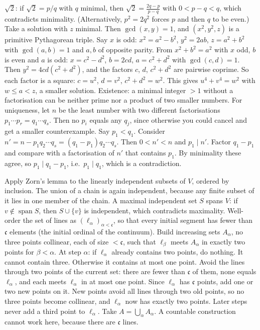 \documentclass[11pt,a4paper]{article}
\begin{document}
 $\sqrt2$: if $\sqrt2=p/q$ with $q$ minimal, then $\sqrt2=\frac{2q-p}{p-q}$ with $0<p-q<q$, which contradicts minimality. (Alternatively, $p^2=2q^2$ forces $p$ and then $q$ to be even.)
 Take a solution with $z$ minimal. Then $\gcd(x,y)=1$, and $(x^2,y^2,z)$ is a primitive Pythagorean triple. Say $x$ is odd: $x^2=a^2-b^2$, $y^2=2ab$, $z=a^2+b^2$ with $\gcd(a,b)=1$ and $a,b$ of opposite parity.
 From $x^2+b^2=a^2$ with $x$ odd, $b$ is even and $a$ is odd: $x=c^2-d^2$, $b=2cd$, $a=c^2+d^2$ with $\gcd(c,d)=1$. Then $y^2=4cd(c^2+d^2)$, and the factors $c$, $d$, $c^2+d^2$ are pairwise coprime.
 So each factor is a square: $c=u^2$, $d=v^2$, $c^2+d^2=w^2$. This gives $u^4+v^4=w^2$ with $w\le a<z$, a smaller solution.
 Existence: a minimal integer $>1$ without a factorisation can be neither prime nor a product of two smaller numbers. For uniqueness, let $n$ be the least number with two different factorisations $p_1\cdots p_r=q_1\cdots q_s$. Then no $p_i$ equals any $q_j$, since otherwise you could cancel and get a smaller counterexample.
 Say $p_1<q_1$. Consider $n'=n-p_1q_2\cdots q_s=(q_1-p_1)q_2\cdots q_s$. Then $0<n'<n$ and $p_1\mid n'$. Factor $q_1-p_1$ and compare with a factorisation of $n'$ that contains $p_1$. By minimality these agree, so $p_1\mid q_1-p_1$, i.e.\ $p_1\mid q_1$, which is a contradiction.

 Apply Zorn's lemma to the linearly independent subsets of $V$, ordered by inclusion. The union of a chain is again independent, because any finite subset of it lies in one member of the chain.
 A maximal independent set $S$ spans $V$: if $v\notin\operatorname{span}S$, then $S\cup\{v\}$ is independent, which contradicts maximality.
 Well-order the set of lines as $(\ell_\alpha)_{\alpha<\mathfrak c}$, so that every initial segment has fewer than $\mathfrak c$ elements (the initial ordinal of the continuum). Build increasing sets $A_\alpha$, no three points collinear, each of size $<\mathfrak c$, such that $\ell_\beta$ meets $A_{\alpha}$ in exactly two points for $\beta<\alpha$.
 At step $\alpha$: if $\ell_\alpha$ already contains two points, do nothing. It cannot contain three. Otherwise it contains at most one point. Avoid the lines through two points of the current set: there are fewer than $\mathfrak c$ of them, none equals $\ell_\alpha$, and each meets $\ell_\alpha$ in at most one point. Since $\ell_\alpha$ has $\mathfrak c$ points, add one or two new points on it.
 New points avoid all lines through two old points, so no three points become collinear, and $\ell_\alpha$ now has exactly two points. Later steps never add a third point to $\ell_\alpha$. Take $A=\bigcup_\alpha A_\alpha$. A countable construction cannot work here, because there are $\mathfrak c$ lines.
\end{document}

